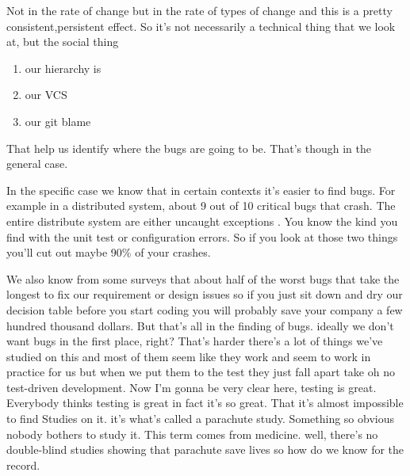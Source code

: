 \documentclass[conference, compsoc, twoside]{IEEEtran}
\begin{document}
Not in the rate of change but in the rate of types of change and this is a pretty consistent,persistent effect.
So it's not necessarily a technical thing that we look at, but the social thing
\begin{enumerate}
	\item our hierarchy is
	\item our VCS
	\item our git blame
\end{enumerate}
That help us identify where the bugs are going to be. That's though in the general case.

In the specific case we know that in certain contexts it's easier to find bugs. 
For example in a distributed system, about 9 out of 10 critical bugs that crash.
The entire distribute system are either uncaught exceptions .
You know the kind you find with the unit test or configuration errors.
So if you look at those two things you'll cut out maybe 90\% of your crashes.

We also know from some surveys that about half of the worst bugs that take the longest to fix our requirement or design issues so if you just sit down and dry our decision table before you start coding you will probably save your company a few hundred thousand dollars. But that's all in the finding of bugs.
ideally we don't want bugs in the first place, right? 
That's harder there's a lot of things we've studied on this and most of them seem like they work and seem to work in practice for us but when we put them to the test they just fall apart take oh no test-driven development.
Now I'm gonna be very clear here, testing is great. 
Everybody thinks testing is great in fact it's so great.
That it's almost impossible to find Studies on it.
it's what's called a parachute study. 
Something so obvious nobody bothers to study it.
This term comes from medicine. well, there's no double-blind studies showing that parachute save lives so how do we know for the record.  
\end{document}
